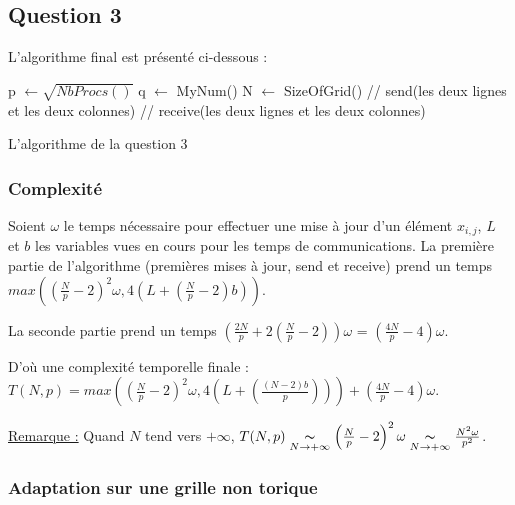 \documentclass{article}
\begin{document}
\subsection*{Question 3}

L'algorithme final est présenté ci-dessous :


\begin{algorithm}[H]
  p $\longleftarrow \sqrt{NbProcs()}$\;
  q $\longleftarrow$ MyNum()\;
  N $\longleftarrow$ SizeOfGrid()\;
  // send(les deux lignes et les deux colonnes) \;
  // receive(les deux lignes et les deux colonnes) \;		
 \caption{L'algorithme de la question 3}
\end{algorithm}

\subsubsection*{Complexité}

Soient $\omega$ le temps nécessaire pour effectuer une mise à jour d'un élément $x_{i,j}$, $L$ et $b$ les variables vues en cours pour les temps de communications. %
La première partie de l'algorithme (premières mises à jour, send et receive) prend un temps $max \left( (\frac{N}{p}-2)^2\omega, 4(L + (\frac{N}{p}-2)b) \right) $.

La seconde partie prend un temps $(\frac{2N}{p} + 2(\frac{N}{p}-2))\omega$ = $(\frac{4N}{p}-4)\omega$.

D'où une complexité temporelle finale : $T(N,p) = max \left( \left(\frac{N}{p}-2\right)^2\omega, 4\left(L + \left(\frac{(N-2)b}{p}\right) \right) \right)  + \left(\frac{4N}{p}-4 \right)\omega $.

\underline{Remarque :} Quand $N$ tend vers $+\infty$, $T(N,p) \underset{N \rightarrow +\infty}{\thicksim} \left(\frac{N}{p}-2\right)^2\omega \underset{N \rightarrow +\infty}{\thicksim} \frac{N^2\omega}{p^2}$. 

\subsubsection*{Adaptation sur une grille non torique}
\end{document}
